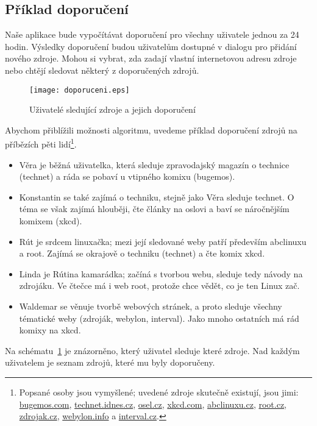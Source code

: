 \subsection{Příklad doporučení}

Naše aplikace bude vypočítávat doporučení pro všechny uživatele jednou za 24 hodin.
Výsledky doporučení budou uživatelům dostupné v dialogu pro přidání nového zdroje.
Mohou si vybrat, zda zadají vlastní internetovou adresu zdroje nebo chtějí sledovat některý z doporučených zdrojů.

\begin{figure}
    \centering
    \texttt{[image: doporuceni.eps]}
    \caption{Uživatelé sledující zdroje a jejich doporučení}
    \label{fig:doporuceni}
\end{figure}

Abychom přiblížili možnosti algoritmu, uvedeme příklad doporučení zdrojů na příbězích pěti lidí\footnote{Popsané osoby jsou vymyšlené; uvedené zdroje skutečně existují, jsou jimi:
\href{http://bugemos.com/}{bugemos.com}, \href{http://technet.idnes.cz/}{technet.idnes.cz},
\href{http://osel.cz/}{osel.cz}, \href{http://xkcd.com/}{xkcd.com}, 
\href{http://www.abclinuxu.cz/}{abclinuxu.cz}, \href{http://www.root.cz/}{root.cz},
\href{http://www.zdrojak.cz/}{zdrojak.cz}, \href{http://webylon.info/}{webylon.info} a
\href{http://interval.cz/}{interval.cz}.
}.

\begin{itemize}
	\item Věra je běžná uživatelka, která sleduje zpravodajský magazín o technice (technet) a ráda se pobaví u vtipného komixu (bugemos).
	\item Konstantin se také zajímá o techniku, stejně jako Věra sleduje technet.
		O téma se však zajímá hlouběji, čte články na oslovi a baví se náročnějším komixem (xkcd).
	\item Rút je srdcem linuxačka; mezi její sledované weby patří především abclinuxu a root.
		Zajímá se okrajově o techniku (technet) a čte komix xkcd.
	\item Linda je Rútina kamarádka; začíná s tvorbou webu, sleduje tedy návody na zdrojáku.
		Ve čtečce má i web root, protože chce vědět, co je ten Linux zač.
	\item Waldemar se věnuje tvorbě webových stránek, a proto sleduje všechny tématické weby (zdroják, webylon, interval).
		Jako mnoho ostatních má rád komixy na xkcd.
\end{itemize}

Na schématu~\ref{fig:doporuceni} je znázorněno, který uživatel sleduje které zdroje.
Nad každým uživatelem je seznam zdrojů, které mu byly doporučeny.

